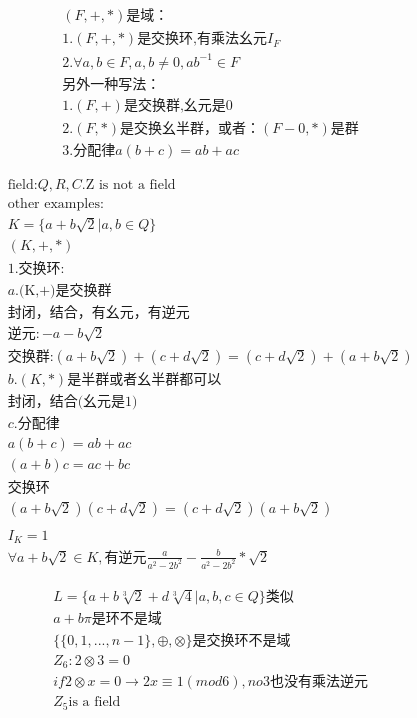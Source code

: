 \documentclass[12pt, a4paper]{article}  %
\begin{document}
\begin{align}
    &(F,+,*)\text{是域：}\\
    &1.(F,+,*)\text{是交换环,有乘法幺元} I_F\\
    &2.\forall a,b\in F,a,b\neq 0,ab^{-1}\in F\\
    &\text{另外一种写法：}\\
    &1.(F,+)\text{是交换群,幺元是0}\\
    &2.(F,*)\text{是交换幺半群，或者：}(F-{0},*)\text{是群}\\
    &3.\text{分配律}a(b+c)=ab+ac
\end{align}

\begin{align}
    &\text{field:}Q,R,C.\text{Z is not a field}\\
    &\text{other examples:}\\
    &K=\{a+b\sqrt{2}| a,b\in Q\}\\
    &(K,+,*)\\
    &1.\text{交换环:}\\
    &a. \text{(K,+)是交换群}\\
    &\text{封闭，结合，有幺元，有逆元}\\
    &\text{逆元}:-a-b\sqrt{2}\\
    &\text{交换群:}(a+b\sqrt{2})+(c+d\sqrt{2})=(c+d\sqrt{2})+(a+b\sqrt{2})\\
    &b.(K,*)\text{是半群或者幺半群都可以}\\
    &\text{封闭，结合(幺元是1)}\\
    &c. \text{分配律}\\
    &a(b+c)=ab+ac\\
    &(a+b)c=ac+bc\\
    &\text{交换环}\\
    &(a+b\sqrt{2})(c+d\sqrt{2})=(c+d\sqrt{2})(a+b\sqrt{2})\\
    & \\
    & I_K=1\\
    &\forall a+b\sqrt{2}\in K,\text{有逆元} \frac{a}{a^2-2b^2}-\frac{b}{a^2-2b^2}*\sqrt{2}
\end{align}

\begin{align}
    &L=\{a+b\sqrt[3]{2}+d\sqrt[3]{4}|a,b,c\in Q\}\text{类似}\\
    &a+b\pi\text{是环不是域}\\
    &\{\{0,1,...,n-1\},\oplus,\otimes\}\text{是交换环不是域}\\
    &Z_6: 2\otimes 3=0\\
    &if 2\otimes x=0\rightarrow 2x\equiv 1(mod 6),no \text{3也没有乘法逆元}\\
    &Z_5\text{is a field}
\end{align}
\end{document}
